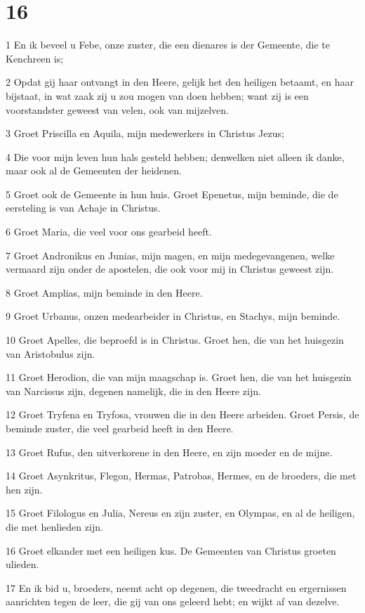 \chapter{16}

\par 1 En ik beveel u Febe, onze zuster, die een dienares is der Gemeente, die te Kenchreen is;
\par 2 Opdat gij haar ontvangt in den Heere, gelijk het den heiligen betaamt, en haar bijstaat, in wat zaak zij u zou mogen van doen hebben; want zij is een voorstandster geweest van velen, ook van mijzelven.
\par 3 Groet Priscilla en Aquila, mijn medewerkers in Christus Jezus;
\par 4 Die voor mijn leven hun hals gesteld hebben; denwelken niet alleen ik danke, maar ook al de Gemeenten der heidenen.
\par 5 Groet ook de Gemeente in hun huis. Groet Epenetus, mijn beminde, die de eersteling is van Achaje in Christus.
\par 6 Groet Maria, die veel voor ons gearbeid heeft.
\par 7 Groet Andronikus en Junias, mijn magen, en mijn medegevangenen, welke vermaard zijn onder de apostelen, die ook voor mij in Christus geweest zijn.
\par 8 Groet Amplias, mijn beminde in den Heere.
\par 9 Groet Urbanus, onzen medearbeider in Christus, en Stachys, mijn beminde.
\par 10 Groet Apelles, die beproefd is in Christus. Groet hen, die van het huisgezin van Aristobulus zijn.
\par 11 Groet Herodion, die van mijn maagschap is. Groet hen, die van het huisgezin van Narcissus zijn, degenen namelijk, die in den Heere zijn.
\par 12 Groet Tryfena en Tryfosa, vrouwen die in den Heere arbeiden. Groet Persis, de beminde zuster, die veel gearbeid heeft in den Heere.
\par 13 Groet Rufus, den uitverkorene in den Heere, en zijn moeder en de mijne.
\par 14 Groet Asynkritus, Flegon, Hermas, Patrobas, Hermes, en de broeders, die met hen zijn.
\par 15 Groet Filologus en Julia, Nereus en zijn zuster, en Olympas, en al de heiligen, die met henlieden zijn.
\par 16 Groet elkander met een heiligen kus. De Gemeenten van Christus groeten ulieden.
\par 17 En ik bid u, broeders, neemt acht op degenen, die tweedracht en ergernissen aanrichten tegen de leer, die gij van ons geleerd hebt; en wijkt af van dezelve.
